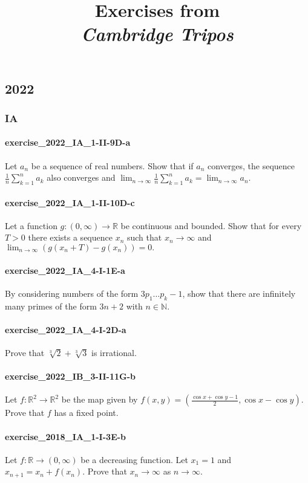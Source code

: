 \documentclass{article}
\title{\textbf{
Exercises from \\
\textit{Cambridge Tripos}
}}
\date{}
\begin{document}
\maketitle

\subsection*{2022}
\subsubsection*{IA}
\paragraph{exercise\_2022\_IA\_1-II-9D-a} Let $a_{n}$ be a sequence of real numbers. Show that if $a_{n}$ converges, the sequence $\frac{1}{n} \sum_{k=1}^{n} a_{k}$ also converges and $\lim _{n \rightarrow \infty} \frac{1}{n} \sum_{k=1}^{n} a_{k}=\lim _{n \rightarrow \infty} a_{n}$.

\paragraph{exercise\_2022\_IA\_1-II-10D-c} Let a function $g:(0, \infty) \rightarrow \mathbb{R}$ be continuous and bounded. Show that for every $T>0$ there exists a sequence $x_{n}$ such that $x_{n} \rightarrow \infty$ and $\lim _{n \rightarrow \infty}\left(g\left(x_{n}+T\right)-g\left(x_{n}\right)\right)=0 .$

\paragraph{exercise\_2022\_IA\_4-I-1E-a} By considering numbers of the form $3 p_{1} \ldots p_{k}-1$, show that there are infinitely many primes of the form $3 n+2$ with $n \in \mathbb{N}$.

\paragraph{exercise\_2022\_IA\_4-I-2D-a} Prove that $\sqrt[3]{2}+\sqrt[3]{3}$ is irrational.

\paragraph{exercise\_2022\_IB\_3-II-11G-b} Let $f: \mathbb{R}^{2} \rightarrow
\mathbb{R}^{2}$ be the map given by $f(x, y)=\left(\frac{\cos x+\cos y-1}{2},
\cos x-\cos y\right)$. Prove that $f$ has a fixed point.

\paragraph{exercise\_2018\_IA\_1-I-3E-b} Let $f: \mathbb{R} \rightarrow(0, \infty)$ be a decreasing function. Let $x_{1}=1$ and $x_{n+1}=x_{n}+f\left(x_{n}\right)$. Prove that $x_{n} \rightarrow \infty$ as $n \rightarrow \infty$.
\end{document}
